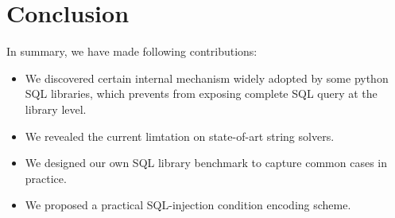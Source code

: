 \documentclass[conference]{IEEEtran}
\begin{document}
\section{Conclusion}
\label{conclusion}
In summary, we have made following contributions:
\begin{itemize}
\item We discovered certain internal mechanism widely adopted by some python SQL libraries, which prevents from exposing complete SQL query at the library level.
\item We revealed the current limtation on state-of-art string solvers.
\item We designed our own SQL library benchmark to capture common cases in practice.
\item We proposed a practical SQL-injection condition encoding scheme.
\end{itemize}



\end{document}
